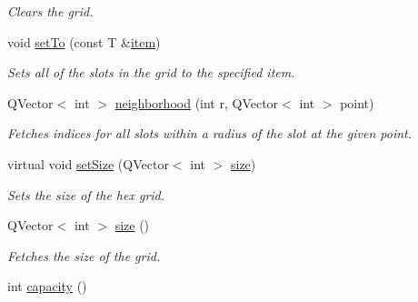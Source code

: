 \begin{DoxyCompactItemize}
\begin{DoxyCompactList}\small\item\em \-Clears the grid. \end{DoxyCompactList}\item 
\hypertarget{classhsom_1_1_grid_ac9b2b7c938d29901e299711151900bbd}{void \hyperlink{classhsom_1_1_grid_ac9b2b7c938d29901e299711151900bbd}{set\-To} (const \-T \&\hyperlink{classhsom_1_1_grid_a991f2eb04dc799ef42c8b58868b9cb8f}{item})}\label{classhsom_1_1_grid_ac9b2b7c938d29901e299711151900bbd}

\begin{DoxyCompactList}\small\item\em \-Sets all of the slots in the grid to the specified item. \end{DoxyCompactList}\item 
\-Q\-Vector$<$ int $>$ \hyperlink{classhsom_1_1_grid_a6bb6f9a0f22054d0d5d39109c3309efd}{neighborhood} (int r, \-Q\-Vector$<$ int $>$ point)
\begin{DoxyCompactList}\small\item\em \-Fetches indices for all slots within a radius of the slot at the given point. \end{DoxyCompactList}\item 
\hypertarget{classhsom_1_1_grid_a7630a12f65349d893d54c9c8ef3b21e9}{virtual void \hyperlink{classhsom_1_1_grid_a7630a12f65349d893d54c9c8ef3b21e9}{set\-Size} (\-Q\-Vector$<$ int $>$ \hyperlink{classhsom_1_1_grid_a3e846473299eb2c7c259659eb61a6234}{size})}\label{classhsom_1_1_grid_a7630a12f65349d893d54c9c8ef3b21e9}

\begin{DoxyCompactList}\small\item\em \-Sets the size of the hex grid. \end{DoxyCompactList}\item 
\hypertarget{classhsom_1_1_grid_a3e846473299eb2c7c259659eb61a6234}{\-Q\-Vector$<$ int $>$ \hyperlink{classhsom_1_1_grid_a3e846473299eb2c7c259659eb61a6234}{size} ()}\label{classhsom_1_1_grid_a3e846473299eb2c7c259659eb61a6234}

\begin{DoxyCompactList}\small\item\em \-Fetches the size of the grid. \end{DoxyCompactList}\item 
\hypertarget{classhsom_1_1_grid_ae77f3109eaa4f66009f90d458bd28ed9}{int \hyperlink{classhsom_1_1_grid_ae77f3109eaa4f66009f90d458bd28ed9}{capacity} ()}\label{classhsom_1_1_grid_ae77f3109eaa4f66009f90d458bd28ed9}


\end{DoxyCompactItemize}
